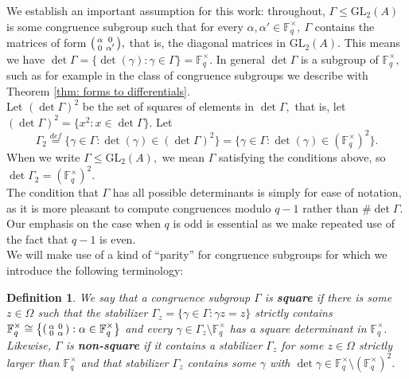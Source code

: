 \documentclass[11pt]{amsart}
\newtheorem{definition}[theorem]{Definition}
\theoremstyle{definition}
\newenvironment{psmallmatrix}
{\left(\begin{smallmatrix}}
	{\end{smallmatrix}\right)}
\numberwithin{equation}{section}
\newcommand{\GL}{\mathrm{GL}} 	%
\newcommand{\bbF}{\mathbb{F}}		%
\begin{document}
		We establish an important assumption for this work:
		throughout, $\Gamma\leq \GL_2(A)$ is some congruence subgroup such that 
		for every $\alpha,\alpha'\in \bbF_q^{\times},~\Gamma$ contains the matrices of form $\displaystyle{\begin{psmallmatrix}\alpha&0\\0&\alpha'\end{psmallmatrix}},$ that is, the diagonal matrices in $\GL_2(A).$ This means we have
		$\det\Gamma=\{\det(\gamma):\gamma\in \Gamma\}=\bbF_q^{\times}.$ In general $\det\Gamma$ is a subgroup of $\bbF_q^{\times},$ such as for example in the class of congruence subgroups we describe with Theorem \ref{thm: forms to differentials}.\\
		
		Let $(\det\Gamma)^2$ be the set of squares of elements in $\det\Gamma,$ that is, let $(\det\Gamma)^2=\{x^2: x\in \det\Gamma\}.$ Let \[\Gamma_2\overset{def}{=}\{\gamma\in \Gamma:\det(\gamma)\in (\det\Gamma)^2\}=\{\gamma\in \Gamma:\det(\gamma)\in (\bbF_q^{\times})^2\}.\]
		When we write $\Gamma\leq \GL_2(A),$ we mean $\Gamma$ satisfying the conditions above, so $\det\Gamma_2=(\bbF_q^{\times})^2.$\\
		
		The condition that $\Gamma$ has all possible determinants is simply for ease of notation, as it is more pleasant to compute congruences modulo $q-1$ rather than $\#\det\Gamma.$ Our emphasis on the case when $q$ is odd is essential as we make repeated use of the fact that $q-1$ is even.\\ 

		We will make use of a kind of  ``parity'' for congruence subgroups for which we introduce the following terminology:
		\begin{definition}
			We say that a congruence subgroup $\Gamma$ is \textbf{square} if there is some $z\in \Omega$ such that the stabilizer $\Gamma_z=\{\gamma\in \Gamma: \gamma z=z\}$ strictly contains 
			$\displaystyle{\bbF_q^{\times}\cong \left\{\begin{psmallmatrix}\alpha&0\\0&\alpha\end{psmallmatrix}:\alpha\in \bbF_q^{\times}\right\}}$ and every $\gamma\in \Gamma_z\setminus \bbF_q^{\times}$ has a square determinant in $\bbF_q^{\times}.$ Likewise, $\Gamma$ is \textbf{non-square} if it contains a stabilizer $\Gamma_z$ for some $z\in \Omega$ strictly larger than $\bbF_q^{\times}$ and that stabilizer $\Gamma_z$ contains some $\gamma$ with $\det\gamma\in \bbF_q^{\times}\setminus (\bbF_q^{\times})^2.$
		\end{definition}
		
\end{document}
